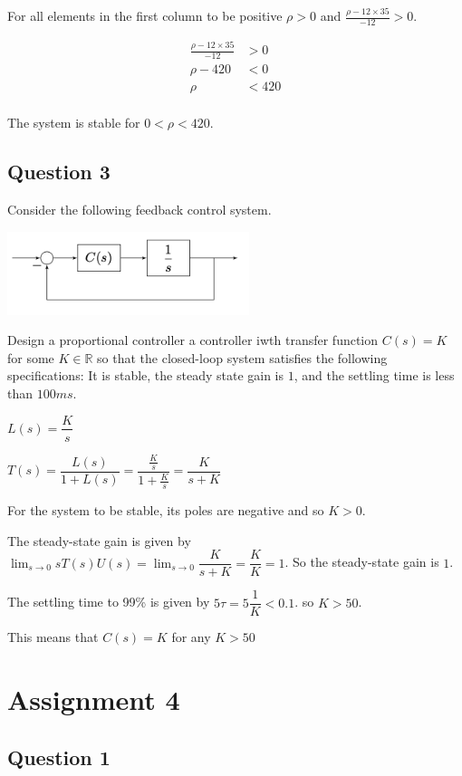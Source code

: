 \documentclass[11pt]{article}
\begin{document}
For all elements in the first column to be positive $\rho > 0$ and $\frac{\rho - 12 \times 35}{-12} > 0$.

\begin{align*}
  \frac{\rho - 12 \times 35}{-12} &> 0 \\
  \rho - 420 &< 0 \\
  \rho &< 420 \\
\end{align*}

The system is stable for $0 < \rho < 420$.

\subsection{Question 3}

Consider the following feedback control system.

\includegraphics[width=200pt]{a3_q3.png}

Design a proportional controller a controller iwth transfer function $C(s) = K$ for some $K \in \mathbb{R}$ so that the closed-loop system satisfies the following specifications: It is stable, the steady state gain is $1$, and the settling time is less than $100ms$.

$L(s) = \dfrac{K}{s}$

$T(s) = \dfrac{L(s)}{1 + L(s)} = \dfrac{\frac{K}{s}}{1 + \frac{K}{s}} = \dfrac{K}{s + K}$

For the system to be stable, its poles are negative and so $K > 0$.

The steady-state gain is given by $\lim_{s \xrightarrow{} 0} s T(s) U(s) = \lim_{s \xrightarrow{} 0} \dfrac{K}{s + K} = \dfrac{K}{K} = 1$. So the steady-state gain is $1$. 

The settling time to 99\% is given by $5 \tau = 5 \dfrac{1}{K} < 0.1$. so $K > 50$.

This means that $C(s) = K$ for any $K > 50$

\section{Assignment 4}

\subsection{Question 1}
\end{document}
